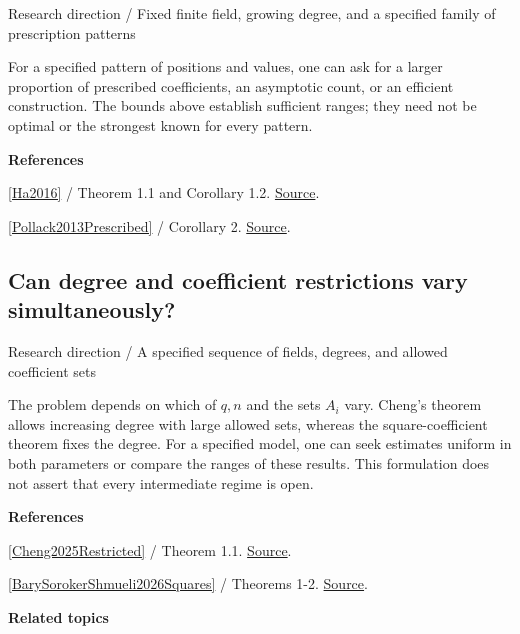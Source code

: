 \documentclass[11pt,a4paper,oneside,openany]{book}
\newenvironment{sources}{\par\smallskip\begingroup\footnotesize\color{atlasgray}\leftskip=10pt\setlength{\parskip}{2pt}}{\par\endgroup\smallskip}
\begin{document}
{\small\sffamily\color{atlasgold}Research direction / Fixed finite field, growing degree, and a specified family of prescription patterns}\par\smallskip
\color{black} For a specified pattern of positions and values, one can ask for a larger proportion of prescribed coefficients, an asymptotic count, or an efficient construction. The bounds above establish sufficient ranges; they need not be optimal or the strongest known for every pattern.\par
\begin{sources}
\textbf{References}\par\smallskip
\noindent\hyperlink{ref:Ha2016}{[Ha2016]} / Theorem 1.1 and Corollary 1.2.  \href{https://arxiv.org/abs/1601.06867}{Source}.\par
\noindent\hyperlink{ref:Pollack2013Prescribed}{[Pollack2013Prescribed]} / Corollary 2.  \href{https://www.pollack-math.net/prescribed.pdf}{Source}.\par
\end{sources}\color{black}
\subsection*{Can degree and coefficient restrictions vary simultaneously?}
{\small\sffamily\color{atlasgold}Research direction / A specified sequence of fields, degrees, and allowed coefficient sets}\par\smallskip
\color{black} The problem depends on which of \(q,n\) and the sets \(A_i\) vary. Cheng's theorem allows increasing degree with large allowed sets, whereas the square-coefficient theorem fixes the degree. For a specified model, one can seek estimates uniform in both parameters or compare the ranges of these results. This formulation does not assert that every intermediate regime is open.\par
\begin{sources}
\textbf{References}\par\smallskip
\noindent\hyperlink{ref:Cheng2025Restricted}{[Cheng2025Restricted]} / Theorem 1.1.  \href{https://doi.org/10.1016/j.ffa.2025.102691}{Source}.\par
\noindent\hyperlink{ref:BarySorokerShmueli2026Squares}{[BarySorokerShmueli2026Squares]} / Theorems 1-2.  \href{https://doi.org/10.1016/j.ffa.2025.102714}{Source}.\par
\end{sources}\color{black}
\par\medskip\begingroup\footnotesize\setlength{\parskip}{1pt}\textbf{\sffamily\color{atlasgreen}Related topics}\par
\end{document}
